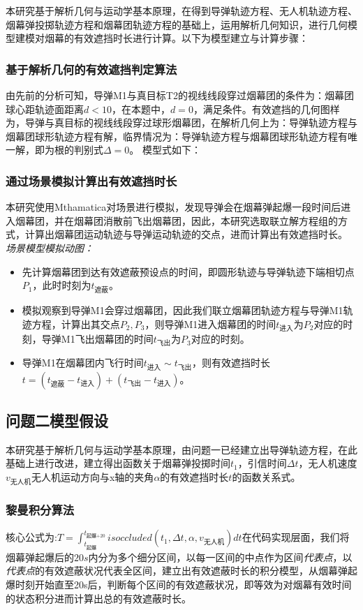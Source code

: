 \documentclass{article}
\begin{document}
本研究基于解析几何与运动学基本原理，在得到导弹轨迹方程、无人机轨迹方程、烟幕弹投掷轨迹方程和烟幕团轨迹方程的基础上，运用解析几何知识，进行几何模型建模对烟幕的有效遮挡时长进行计算。以下为模型建立与计算步骤：

\subsubsection{基于解析几何的有效遮挡判定算法}

由先前的分析可知，导弹M1与真目标T2的视线线段穿过烟幕团的条件为：烟幕团球心距轨迹面距离$d<10$，在本题中，$d = 0$，满足条件。有效遮挡的几何图样为，导弹与真目标的视线线段穿过球形烟幕团，在解析几何上为：导弹轨迹方程与烟幕团球形轨迹方程有解，临界情况为：导弹轨迹方程与烟幕团球形轨迹方程有唯一解，即为根的判别式$\Delta  = 0$。
模型式如下：
\subsubsection{通过场景模拟计算出有效遮挡时长}
本研究使用Mthamatica对场景进行模拟，发现导弹会在烟幕弹起爆一段时间后进入烟幕团，并在烟幕团消散前飞出烟幕团，因此，本研究选取联立解方程组的方式，计算出烟幕团运动轨迹与导弹运动轨迹的交点，进而计算出有效遮挡时长。
\textit{场景模型模拟动图：}

\begin{itemize}
    \item 先计算烟幕团到达有效遮蔽预设点的时间，即圆形轨迹与导弹轨迹下端相切点$P_1$，此时时刻为$t_\text{遮蔽}$。
    \item 模拟观察到导弹M1会穿过烟幕团，因此我们联立烟幕团轨迹方程与导弹M1轨迹方程，计算出其交点$P_2,P_3$，则导弹M1进入烟幕团的时间$t_{\text{进入}}$为$P_2$对应的时刻，导弹M1飞出烟幕团的时间$t_{\text{飞出}}$为$P_3$对应的时刻。
    \item 导弹M1在烟幕团内飞行时间$t_{\text{进入}} \sim t_{\text{飞出}}$，则有效遮挡时长$t =(t_\text{遮蔽}- t_\text{进入}) + (t_{\text{飞出}} - t_{\text{进入}})$。
\end{itemize}
\subsection{问题二模型假设}
本研究基于解析几何与运动学基本原理，由问题一已经建立出导弹轨迹方程，在此基础上进行改进，建立得出函数关于烟幕弹投掷时间$t_1$，引信时间$\Delta t$，无人机速度 $v_\text{无人机}$无人机运动方向与x轴的夹角$\alpha$的有效遮挡时长$t$的函数关系式。


\subsubsection{黎曼积分算法}
核心公式为:$T = \int_{t_\text{起爆}}^{t_\text{起爆+20}}isoccluded(t_1,\Delta t , \alpha , v_\text{无人机})dt$在代码实现层面，我们将烟幕弹起爆后的$20s$内分为多个细分区间，以每一区间的中点作为区间\textit{代表点}，以\textit{代表点}的有效遮蔽状况代表全区间，建立出有效遮蔽时长的积分模型，从烟幕弹起爆时刻开始直至20s后，判断每个区间的有效遮蔽状况，即等效为对烟幕有效时间的状态积分进而计算出总的有效遮蔽时长。
\end{document}
